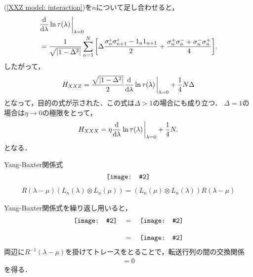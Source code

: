 \documentclass[dvipdfmx,9pt]{beamer}
\newcommand\Includegraphics[2][]{\vcenter{\hbox{\texttt{[image: \#2]}}}}
\numberwithin{equation}{section}
\begin{document}
\begin{frame}{}
    (\ref{XXZ model: interaction})を$n$について足し合わせると，
    \begin{align}
        &\nonumber
        \dv{\lambda}\ln\tau(\lambda)\eval_{\lambda=0}
        \\ &
        = \frac{1}{\sqrt{|1-\Delta^2|}} \sum_{n=1}^N \qty[
            \Delta \frac{\sigma_n^z \sigma_{n+1}^z - 1_n 1_{n+1}}{2} + \frac{\sigma_n^+\sigma_n^- + \sigma_n^- \sigma_n^+}{4}
        ].
    \end{align}
    したがって，
    \begin{align}
        H_{XXZ} 
        = \frac{\sqrt{|1-\Delta^2|}}{2}\dv{\lambda}\ln\tau(\lambda)\eval_{\lambda=0} + \frac{1}{4}N\Delta
    \end{align}
    となって，目的の式が示された．この式は$\Delta>1$の場合にも成り立つ．
    $\Delta = 1$の場合は$\eta \to 0$の極限をとって，
    \begin{align}
        H_{XXX} = \eta \dv{\lambda}\ln\tau(\lambda)\eval_{\lambda=0} + \frac{1}{4}N.
    \end{align}
    となる．
\end{frame}

\begin{frame}{Yang-Baxter関係式}
    \begin{align}
        \Includegraphics[scale = 0.2]{YBE.pdf}
        \label{YBE}
    \end{align}
    \begin{align}
        R(\lambda-\mu)(L_n(\lambda) \otimes L_n(\mu)) = (L_n(\mu)\otimes L_n(\lambda))R(\lambda-\mu)
    \end{align}
\end{frame}
\begin{frame}{}
    Yang-Baxter関係式を繰り返し用いると，
    \begin{align*}
        \Includegraphics[scale = 0.15]{YBE-1.pdf}
        \quad &= \quad \Includegraphics[scale = 0.15]{YBE-2.pdf}
        \\[10pt] &
        =\quad \Includegraphics[scale = 0.15]{YBE-3.pdf} 
    \end{align*}
    両辺に$R^{-1}(\lambda-\mu)$を掛けてトレースをとることで，転送行列の間の交換関係
    \begin{align}
        [\tau(\lambda),\tau(\mu)] = 0
    \end{align}
    を得る．
\end{frame}
\end{document}
